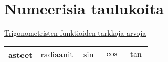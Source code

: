 \clearpage

\section{Numeerisia taulukoita}

\begin{table}[ht!]
\centering
\caption{\href{https://en.wikipedia.org/wiki/Trigonometric_constants_expressed_in_real_radicals}{Trigonometristen funktioiden tarkkoja arvoja} \cite[s. 54-55]{MAOL}}
\end{table}

{
\tabulinesep=1mm
\begin{longtabu} to 

asteet	& 	& \sin	& \cos	& \tan \\
\hline
\endhead


\end{longtabu}}
